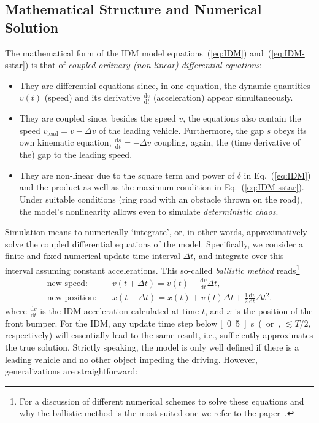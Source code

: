 \documentclass[paper=A4,pagesize=auto,11pt]{scrartcl}
\providecommand{\gquote}[1]{`#1'}
\newcommand{\refkl}[1]{(\ref{#1})}
\newcommand{\D}{\text{d}}
\providecommand{\abl}[2] {\frac{\D #1}{\D #2}}
\begin{document}
\subsection{Mathematical Structure and Numerical Solution}
The mathematical form of the IDM model equations~\refkl{eq:IDM} and~\refkl{eq:IDM-sstar} is that of \textit{coupled ordinary (non-linear) differential equations}:
\begin{itemize}
\item
They are differential equations since, in one equation, the dynamic quantities $v(t)$ (speed) and its derivative $\abl{v}{t}$ (acceleration) appear simultaneously.
\item
They are coupled since, besides the speed $v$, the equations also
contain the speed $v_\text{lead}=v-\Delta v$  of the leading
vehicle. Furthermore, the gap $s$ obeys its own  kinematic equation,
$\abl{s}{t}=-\Delta v$ coupling, again, the (time derivative of the) gap to the leading speed. 
\item
They are non-linear due to the square term and power of $\delta$ in
Eq.~\refkl{eq:IDM} and the product as well as the maximum condition 
 in Eq.~\refkl{eq:IDM-sstar}. Under suitable conditions (ring road
 with an obstacle thrown on the road), the model's nonlinearity
 allows even to 
 simulate \textit{deterministic chaos}.
\end{itemize} 
%
Simulation means to numerically \gquote{integrate}, or, in other
words, approximatively solve the coupled differential equations of the
model. Specifically, we consider a finite and fixed numerical update
time interval 
$\Delta t$, and integrate over this interval assuming constant
accelerations. This so-called \textit{ballistic method}
reads\footnote{For a discussion of different numerical schemes to
  solve these equations and why the ballistic method is the most
  suited one we refer to the paper~\cite{TreiberNumerics2015}.}  
\begin{align}
\text{new speed:}\quad & v(t+\Delta t) = v(t) + \abl{v}{t} \Delta t,\\
\text{new position:}\quad & x(t+\Delta t) = x(t) + v(t) \Delta t + \frac{1}{2} \abl{v}{t}  \Delta t^2.
\end{align}
where $\abl{v}{t}$ is the IDM acceleration calculated at time $t$, and $x$ is the position of the front bumper. For the IDM, any update time step below \unit[0.5]{s} (or, $\lesssim T/2$, respectively) will essentially lead to the same result, i.e., sufficiently approximates the true solution. Strictly speaking, the model is only well defined if there is a leading vehicle and no other object impeding the driving. However, generalizations are straightforward:
\end{document}

